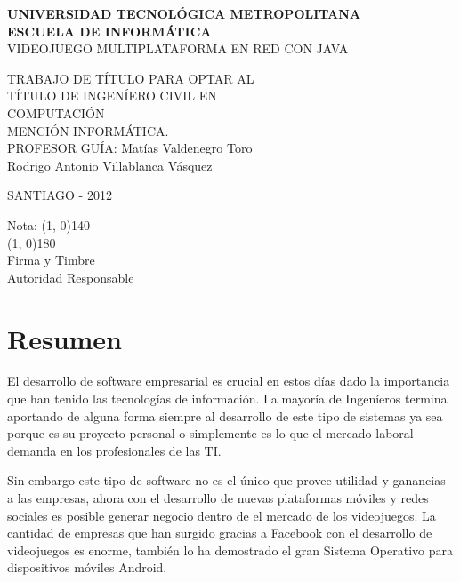 \documentclass[a4paper,12pt,openany,oneside]{book}
\begin{document}
\thispagestyle{empty}
\begin{center}
\textbf{UNIVERSIDAD TECNOLÓGICA METROPOLITANA\\
ESCUELA DE INFORMÁTICA}\\
\vspace{3cm}
VIDEOJUEGO MULTIPLATAFORMA EN RED CON JAVA
\end{center}
\begin{flushright}
TRABAJO DE TÍTULO PARA OPTAR AL\\
TÍTULO DE INGENÍERO CIVIL EN\\
COMPUTACIÓN\\
MENCIÓN INFORMÁTICA.\\
\vspace{3cm}
PROFESOR GUÍA: Matías Valdenegro Toro\\
\vspace{1.5cm}
Rodrigo Antonio Villablanca Vásquez
\end{flushright}
\vspace{4cm}
\begin{center}
SANTIAGO - 2012
\end{center}
\newpage
\thispagestyle{empty}
\begin{flushright}
\vspace{20mm}
Nota: \line(1, 0){140} \\
\vspace{30 mm}
\line(1, 0){180}\\	
Firma y Timbre\\
Autoridad Responsable
\end{flushright}
\chapter*{Resumen}
\thispagestyle{empty}
El desarrollo de software empresarial es crucial en estos días dado la importancia que han tenido las tecnologías de información. La mayoría de Ingeníeros termina aportando de alguna forma siempre al desarrollo de este tipo de sistemas ya sea porque es su proyecto personal o simplemente es lo que el mercado laboral demanda en los profesionales de las TI.

Sin embargo este tipo de software no es el único que provee utilidad y ganancias a las empresas, ahora con el desarrollo de nuevas plataformas móviles y redes sociales es posible generar negocio dentro de el mercado de los videojuegos. La cantidad de empresas que han surgido gracias a Facebook con el desarrollo de videojuegos es enorme, también lo ha demostrado el gran Sistema Operativo para dispositivos móviles Android.
\end{document}
